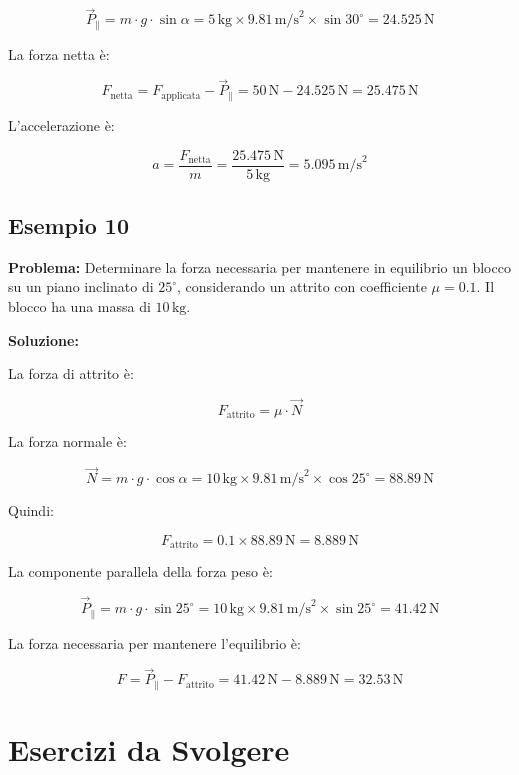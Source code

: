 \documentclass[a4paper,12pt]{article}
\begin{document}
\[
\vec{P}_\parallel = m \cdot g \cdot \sin{\alpha} = 5\,\text{kg} \times 9.81\,\text{m/s}^2 \times \sin{30^\circ} = 24.525\,\text{N}
\]

La forza netta è:

\[
F_{\text{netta}} = F_{\text{applicata}} - \vec{P}_\parallel = 50\,\text{N} - 24.525\,\text{N} = 25.475\,\text{N}
\]

L'accelerazione è:

\[
a = \frac{F_{\text{netta}}}{m} = \frac{25.475\,\text{N}}{5\,\text{kg}} = 5.095\,\text{m/s}^2
\]

\subsection*{Esempio 10}

\textbf{Problema:} Determinare la forza necessaria per mantenere in equilibrio un blocco su un piano inclinato di $25^\circ$, considerando un attrito con coefficiente $\mu = 0.1$. Il blocco ha una massa di $10\,\text{kg}$.

\textbf{Soluzione:}

La forza di attrito è:

\[
F_{\text{attrito}} = \mu \cdot \vec{N}
\]

La forza normale è:

\[
\vec{N} = m \cdot g \cdot \cos{\alpha} = 10\,\text{kg} \times 9.81\,\text{m/s}^2 \times \cos{25^\circ} = 88.89\,\text{N}
\]

Quindi:

\[
F_{\text{attrito}} = 0.1 \times 88.89\,\text{N} = 8.889\,\text{N}
\]

La componente parallela della forza peso è:

\[
\vec{P}_\parallel = m \cdot g \cdot \sin{25^\circ} = 10\,\text{kg} \times 9.81\,\text{m/s}^2 \times \sin{25^\circ} = 41.42\,\text{N}
\]

La forza necessaria per mantenere l'equilibrio è:

\[
F = \vec{P}_\parallel - F_{\text{attrito}} = 41.42\,\text{N} - 8.889\,\text{N} = 32.53\,\text{N}
\]

\section{Esercizi da Svolgere}
\end{document}
